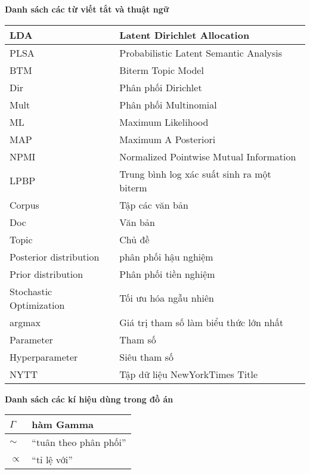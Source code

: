 \documentclass[fontsize=13pt]{scrartcl}
\begin{document}

\newpage
\tableofcontents

\newpage
\textbf{Danh sách các từ viết tắt và thuật ngữ}
\begin{table}[H]
\begin{center}
\begin{tabular}{|l|l|}
\hline
LDA & Latent Dirichlet Allocation \\
\hline
PLSA & Probabilistic Latent Semantic Analysis\\
\hline
BTM & Biterm Topic Model\\
\hline
Dir & Phân phối Dirichlet \\
\hline
Mult & Phân phối Multinomial \\
\hline
ML & Maximum Likelihood \\
\hline
MAP & Maximum A Posteriori \\
\hline
NPMI & Normalized Pointwise Mutual Information\\
\hline 
LPBP & Trung bình log xác suất sinh ra một biterm \\
\hline
Corpus & Tập các văn bản\\
\hline
Doc & Văn bản \\
\hline
Topic & Chủ đề\\
\hline
Posterior distribution & phân phối hậu nghiệm \\
\hline
Prior distribution & Phân phối tiền nghiệm \\
\hline
Stochastic Optimization & Tối ưu hóa ngẫu nhiên \\
\hline
argmax & Giá trị tham số làm biểu thức lớn nhất \\
\hline
Parameter & Tham số \\
\hline
Hyperparameter & Siêu tham số \\
\hline 
NYTT & Tập dữ liệu NewYorkTimes Title \\
\hline
\end{tabular}
\end{center}
\end{table}


\textbf{Danh sách các kí hiệu dùng trong đồ án}
\begin{table}[H]
\begin{tabular}{|l|l|}
\hline
$\Gamma$ & hàm Gamma \\ \hline
$\sim$ & ``tuân theo phân phối'' \\ \hline
$\propto$ & ``tỉ lệ với'' \\ \hline

\end{tabular}
\end{table}
\end{document}
